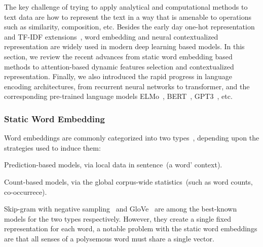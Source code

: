 The key challenge of trying to apply analytical and computational
methods to text data are how to represent the text in a way that is
amenable to operations such as similarity, composition, etc. Besides
the early day one-hot representation and TF-IDF
extensions~\citep{jones1972statistical}, word embedding and neural
contextualized representation are widely used in modern deep learning
based models. In this section, we review the recent advances from
static word embedding based methods to attention-based dynamic
features selection and contextualized representation. Finally, we also
introduced the rapid progress in language encoding architectures, from
recurrent neural networks to transformer, and the corresponding
pre-trained language models ELMo~\citep{elmo},
BERT~\citep{devlin2018bert}, GPT3~\cite{brown2020language}, etc.

\subsubsection{Static Word Embedding}
\label{sssec:bg:static-embedding}
Word embeddings are commonly categorized into two
types~\citep{Baroni:2014,pennington2014glove,li2015generative},
depending upon the strategies used to induce them:
\begin{inparaenum}[(1)]
\item Prediction-based models, via local data in sentence~(a word'
  context).
\item Count-based models, via the global corpus-wide statistics~(such
  as word counts, co-occurrece).
\end{inparaenum}

Skip-gram with negative sampling~\cite[SGNS,][]{mikolov13w2v} and
GloVe~\cite{pennington2014glove} are among the best-known models for
the two types respectively. However, they create a single fixed
representation for each word, a notable problem with the static word
embeddings are that all senses of a polysemous word must share a single
vector.

